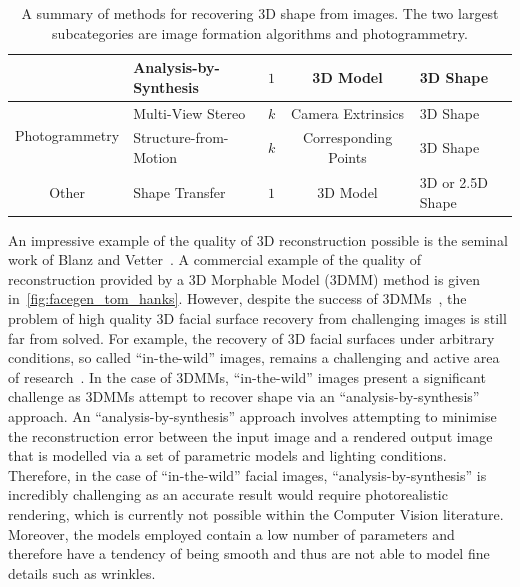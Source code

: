\begin{table}[t]
{\begin{tabular}{@{}llccl@{}}
		                                                    & Analysis-by-Synthesis                                                        & $1$       & 3D Model                                                                          & 3D Shape                   \\ \midrule
		\multicolumn{1}{c}{\multirow{2}{*}{Photogrammetry}} & Multi-View Stereo                                                            & $k$       & Camera Extrinsics                                                                 & 3D Shape                   \\ \cmidrule(l){3-5} 
		\multicolumn{1}{c}{}                                & Structure-from-Motion                                                        & $k$       & Corresponding Points                                                              & 3D Shape                   \\ \midrule
		\multicolumn{1}{c}{Other}                           & Shape Transfer                                                               & $1$       & 3D Model                                                                          & 3D or 2.5D Shape           \\ \bottomrule
		\end{tabular}
	}
	\caption{A summary of methods for recovering 3D shape from images. The two 
	         largest subcategories are image formation algorithms and 
	         photogrammetry.}
\label{tbl:3d_recovery_methods}
\end{table}
An impressive example of the quality of 3D reconstruction possible is the
seminal work of Blanz and Vetter~\cite{RefWorks:96}. A commercial example of the
quality of reconstruction provided by a 3D Morphable Model (3DMM) method
is given in~\cref{fig:facegen_tom_hanks}. However, despite the success of 
3DMMs~\cite{RefWorks:96}, the problem of high quality 3D facial 
surface recovery from challenging images is still far from solved. For example,
the recovery of 3D facial surfaces under arbitrary conditions,
so called ``in-the-wild'' images, remains a challenging and active area of
research~\cite{KemelmacherShlizerman:2013iv,Suwajanakorn:2015gf,Suwajanakorn:2014bl,Snape:2015gl,Roth:2015hq}.
In the case of 3DMMs, ``in-the-wild'' images present a significant challenge
as 3DMMs attempt to recover shape via an ``analysis-by-synthesis'' approach. An
``analysis-by-synthesis'' approach involves attempting to minimise the 
reconstruction error between the input image and a rendered output image that
is modelled via a set of parametric models and lighting conditions. Therefore,
in the case of ``in-the-wild'' facial images, ``analysis-by-synthesis'' is
incredibly challenging as an accurate result would require photorealistic
rendering, which is currently not possible within the Computer Vision
literature. Moreover, the models employed contain a low number
of parameters and therefore have a tendency of being smooth and thus are not 
able to model fine details such as wrinkles.

